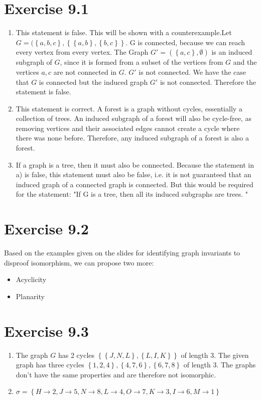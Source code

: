 \documentclass{article} %
\newcommand{\homeworkNumber}{9}
\begin{document}
\section*{Exercise \homeworkNumber.1}
\begin{enumerate}
	\item This statement is false. This will be shown with a counterexample.Let \( G =  (\left\{ a,b,c \right\},\left\{ \left\{ a,b \right\}, \left\{ b,c \right\}  \right\}    \). G is connected, because we can reach every vertex from every vertex. The Graph \( G' = (\left\{ a,c \right\}, \emptyset) \) is an induced subgraph of \( G \), since it is formed from a subset of the vertices from \( G \) and the vertices \( a,c \) are not connected in \( G \). \( G' \) is not connected. We have the case that \( G \) is connected but the induced graph \( G' \) is not connected. Therefore the statement is false.
	\item This statement is correct. A forest is a graph without cycles, essentially a collection of trees. An induced subgraph of a forest will also be cycle-free, as removing vertices and their associated edges cannot create a cycle where there was none before. Therefore, any induced subgraph of a forest is also a forest.
	\item If a graph is a tree, then it must also be connected. Because the statement in a) is false, this statement must also be false, i.e. it is not guaranteed that an induced graph of a connected graph is connected. But this would be required for the statement: "If G is a tree, then all its induced subgraphs are trees. "
\end{enumerate}

\section*{Exercise \homeworkNumber.2}

Based on the examples given on the slides for identifying graph invariants to disproof isomorphism, we can propose two more:
\begin{itemize}
    \item Acyclicity
    \item Planarity
\end{itemize}

\section*{Exercise \homeworkNumber.3}
\begin{enumerate}
	\item The graph \( G \) has 2 cycles \( \left\{ \left\{ J , N, L \right\}, \left\{ L, I, K \right\} \right\} \) of length 3. The given graph has three cycles \( \left\{ 1,2,4 \right\}, \left\{ 4,7,6 \right\}, \left\{ 6,7,8 \right\}  \) of length 3. The graphs don't have the same properties and are therefore not isomorphic.

	\item \( \sigma = \left\{ H \to 2, J \to 5, N \to 8, L \to 4, O \to 7, K \to 3, I \to 6, M \to 1 \right\}  \)

\end{enumerate}
\end{document}
